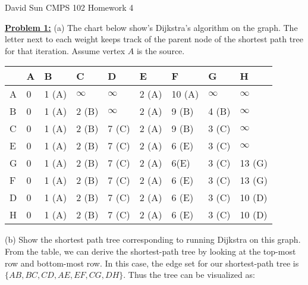 \documentclass[11pt]{article}
\begin{document}
\begin{flushleft}
	David Sun \newline
	CMPS 102 \newline
	Homework 4
	\item\textbf{\underline{Problem 1:}} \newline (a) The chart below show's Dijkstra's algorithm on the graph. The letter next to each weight keeps track of the parent node of the shortest path tree for that iteration. Assume vertex $A$ is the source. 
	
	\begin{center}
		\begin{tabular}{ | p{1cm} | p{1.2cm} | p{1.2cm} | p{1.2cm} | p{1.2cm} | p{1.2cm} | p{1.2cm} | p{1.2cm} | p{1.2cm} | }
			\hline
			$ $ & A & B & C & D & E & F & G & H\\ 
			
			\hline
			A & 0 & 1 (A) & $\infty$ & $\infty$ & 2 (A) & 10 (A) & $\infty$ & $\infty$ \\
			
			\hline
			B & 0 & 1 (A) & 2 (B) & $\infty$ & 2 (A) & 9 (B) & 4 (B) & $\infty$ \\
			
			\hline
			C & 0 & 1 (A) & 2 (B) & 7 (C) & 2 (A) & 9 (B) & 3 (C) & $\infty$ \\
			
			\hline
			E & 0 & 1 (A) & 2 (B) & 7 (C) & 2 (A) & 6 (E) & 3 (C) & $\infty$ \\
			
			\hline
			G & 0 & 1 (A) & 2 (B) & 7 (C) & 2 (A) & 6(E) & 3 (C) & 13 (G)\\
			
			\hline
			F & 0 & 1 (A) & 2 (B) & 7 (C) & 2 (A) & 6 (E) & 3 (C) & 13 (G)\\
			
			\hline
			D & 0 & 1 (A) & 2 (B) & 7 (C) & 2 (A) & 6 (E) & 3 (C) & 10 (D)\\
			
			\hline
			H & 0 & 1 (A) & 2 (B) & 7 (C) & 2 (A) & 6 (E) & 3 (C) & 10 (D)\\
			\hline
		\end{tabular}
	\end{center}
	(b) Show the shortest path tree corresponding to running Dijkstra on
	this graph. 
	\newline
	From the table, we can derive the shortest-path tree by looking at the top-most row and bottom-most row. In this case, the edge set for our shortest-path tree is $\lbrace AB, BC, CD, AE, EF, CG, DH\rbrace$. Thus the tree can be visualized as:
	

\end{flushleft}
\end{document}
